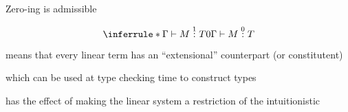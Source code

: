 \documentclass[xetex,serif,mathserif,aspectratio=169]{beamer}
\newcommand{\titlecard}[1]{\begin{frame}%
  \begin{center}%
    \Large \textcolor{titlered}{#1}%
  \end{center}%
\end{frame}}
\newcommand{\HEAD}[1]{\textcolor{titlered}{#1}}
\begin{document}
\begin{frame}
  \HEAD{Zero-ing is admissible}

  \begin{displaymath}
    \inferrule*
    {\Gamma \vdash M \stackrel{1}: T}
    {0\Gamma \vdash M \stackrel{0}: T}
  \end{displaymath}

  \bigskip

  means that every linear term has an ``extensional'' counterpart (or constitutent)

  \bigskip

  which can be used at type checking time to construct types

  \bigskip

  has the effect of making the linear system a restriction of the intuitionistic
\end{frame}










\end{document}
